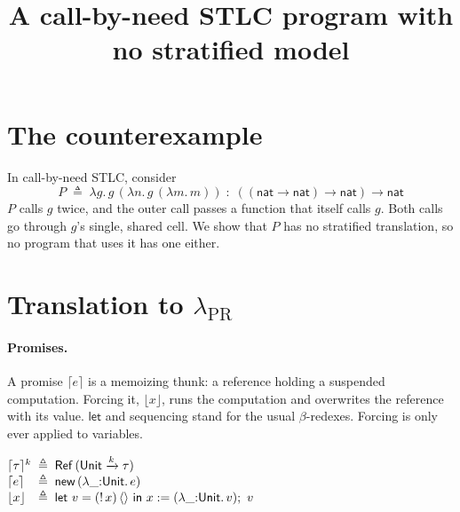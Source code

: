 \documentclass[11pt]{article}
\title{A call-by-need STLC program with no stratified model}
\date{}
\newcommand{\Unit}{\mathsf{Unit}}
\newcommand{\tRef}{\mathsf{Ref}\,}
\newcommand{\arr}[1]{\xrightarrow{#1}}
\newcommand{\new}{\mathsf{new}\,}
\newcommand{\deref}{!\,}
\newcommand{\assign}{\mathrel{:=}}
\newcommand{\unit}{\langle\rangle}
\newcommand{\lam}[2]{\lambda #1{:}#2.\,}
\newcommand{\klet}{\mathsf{let}\ }
\newcommand{\kin}{\ \mathsf{in}\ }
\newcommand{\Prom}[2]{\lceil #2 \rceil^{#1}}
\newcommand{\prom}[1]{\lceil #1 \rceil}
\newcommand{\frc}[1]{\lfloor #1 \rfloor}
\newcommand{\snat}{\mathsf{nat}}
\newcommand{\slam}[1]{\lambda #1.\,}
\begin{document}
\maketitle

\section{The counterexample}

In call-by-need STLC, consider
\[
  P \;\triangleq\; \slam{g} g\,(\slam{n} g\,(\slam{m} m))
  \;:\; ((\snat \to \snat) \to \snat) \to \snat
\]
$P$ calls $g$ twice, and the outer call passes a function that itself calls
$g$. Both calls go through $g$'s single, shared cell. We show that $P$ has no
stratified translation, so no program that uses it has one either.

\section{Translation to $\lambda_{\mathrm{PR}}$}

\paragraph{Promises.}
A promise $\prom{e}$ is a memoizing thunk: a reference holding a suspended
computation. Forcing it, $\frc{x}$, runs the computation and overwrites the
reference with its value. $\mathsf{let}$ and sequencing stand for the usual
$\beta$-redexes. Forcing is only ever applied to variables.

\medskip
\noindent\quad
$\begin{array}{@{}l@{\;\;\triangleq\;\;}l@{}}
  \Prom{k}{\tau} & \tRef (\Unit \arr{k} \tau) \\
  \prom{e} & \new (\lam{\_}{\Unit} e) \\
  \frc{x} & \klet v = (\deref x)\,\unit \kin x \assign (\lam{\_}{\Unit} v);\ v
\end{array}$
\medskip
\end{document}
